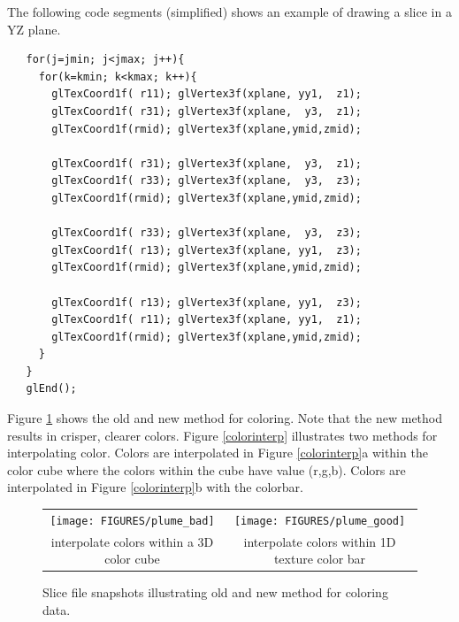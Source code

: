 \documentclass[11pt,twoside]{book}
\begin{document}
The following code segments (simplified) shows an example of drawing a slice in a YZ plane.

\begin{lstlisting}
   for(j=jmin; j<jmax; j++){
     for(k=kmin; k<kmax; k++){
       glTexCoord1f( r11); glVertex3f(xplane, yy1,  z1);
       glTexCoord1f( r31); glVertex3f(xplane,  y3,  z1);
       glTexCoord1f(rmid); glVertex3f(xplane,ymid,zmid);

       glTexCoord1f( r31); glVertex3f(xplane,  y3,  z1);
       glTexCoord1f( r33); glVertex3f(xplane,  y3,  z3);
       glTexCoord1f(rmid); glVertex3f(xplane,ymid,zmid);

       glTexCoord1f( r33); glVertex3f(xplane,  y3,  z3);
       glTexCoord1f( r13); glVertex3f(xplane, yy1,  z3);
       glTexCoord1f(rmid); glVertex3f(xplane,ymid,zmid);

       glTexCoord1f( r13); glVertex3f(xplane, yy1,  z3);
       glTexCoord1f( r11); glVertex3f(xplane, yy1,  z1);
       glTexCoord1f(rmid); glVertex3f(xplane,ymid,zmid);
     }
   }
   glEnd();
\end{lstlisting}



Figure \ref{fignewslice} shows the old and new method for coloring.  Note that the new method results in crisper, clearer colors.
Figure \ref{colorinterp} illustrates two methods for interpolating color.  Colors are interpolated in Figure \ref{colorinterp}a within the color cube where the colors within the cube have value (r,g,b).  Colors are interpolated in Figure \ref{colorinterp}b with the colorbar.

\begin{figure}[\figoptions]
\begin{center}
\begin{tabular}{cc}
\texttt{[image: FIGURES/plume\_bad]}&\texttt{[image: FIGURES/plume\_good]}\\
interpolate colors within a 3D color cube&interpolate colors within 1D texture color bar\\
\end{tabular}
\caption [Slice file snapshots illustrating old and new method for
coloring data.] {Slice file snapshots illustrating old and new
method for coloring data.}
\label{fignewslice}%
\end{center}
\end{figure}
\end{document}
